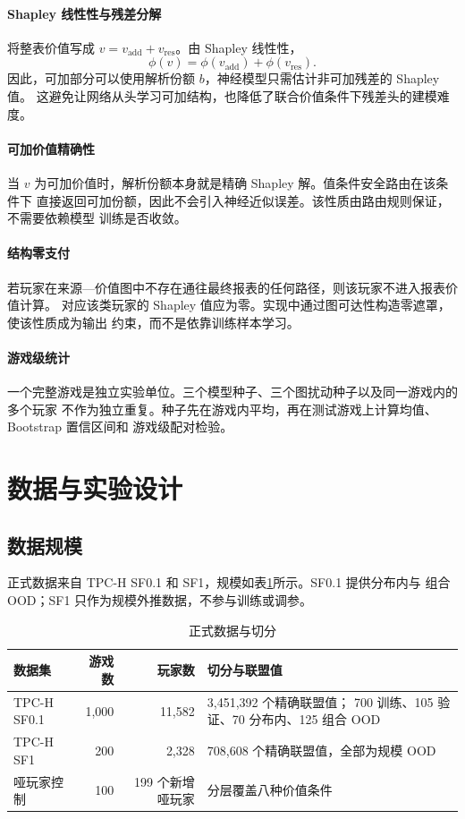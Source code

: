 \documentclass{coursepaper}
\begin{document}
\paragraph{Shapley 线性性与残差分解}
将整表价值写成 \(v=v_{\mathrm{add}}+v_{\mathrm{res}}\)。由 Shapley 线性性，
\[
  \phi(v)=\phi(v_{\mathrm{add}})+\phi(v_{\mathrm{res}}).
\]
因此，可加部分可以使用解析份额 \(b\)，神经模型只需估计非可加残差的 Shapley 值。
这避免让网络从头学习可加结构，也降低了联合价值条件下残差头的建模难度。

\paragraph{可加价值精确性}
当 \(v\) 为可加价值时，解析份额本身就是精确 Shapley 解。值条件安全路由在该条件下
直接返回可加份额，因此不会引入神经近似误差。该性质由路由规则保证，不需要依赖模型
训练是否收敛。

\paragraph{结构零支付}
若玩家在来源—价值图中不存在通往最终报表的任何路径，则该玩家不进入报表价值计算。
对应该类玩家的 Shapley 值应为零。实现中通过图可达性构造零遮罩，使该性质成为输出
约束，而不是依靠训练样本学习。

\paragraph{游戏级统计}
一个完整游戏是独立实验单位。三个模型种子、三个图扰动种子以及同一游戏内的多个玩家
不作为独立重复。种子先在游戏内平均，再在测试游戏上计算均值、Bootstrap 置信区间和
游戏级配对检验。

\section{数据与实验设计}

\subsection{数据规模}

正式数据来自 TPC-H SF0.1 和 SF1，规模如表\ref{tab:data}所示。SF0.1 提供分布内与
组合 OOD；SF1 只作为规模外推数据，不参与训练或调参。

\begin{table}[htbp]
  \centering
  \caption{正式数据与切分}
  \label{tab:data}
  \small
  \begin{tabularx}{\textwidth}{@{}lrrX@{}}
    \hline
    数据集 & 游戏数 & 玩家数 & 切分与联盟值 \\
    \hline
    TPC-H SF0.1 & 1,000 & 11,582 & 3,451,392 个精确联盟值；
    700 训练、105 验证、70 分布内、125 组合 OOD \\
    TPC-H SF1 & 200 & 2,328 & 708,608 个精确联盟值，全部为规模 OOD \\
    哑玩家控制 & 100 & 199 个新增哑玩家 & 分层覆盖八种价值条件 \\
    \hline
  \end{tabularx}
\end{table}
\end{document}
